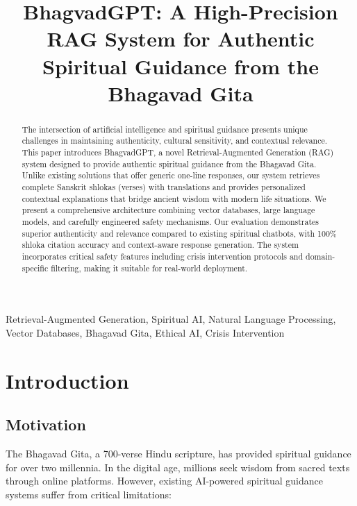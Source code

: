 \documentclass[conference]{IEEEtran}
\begin{document}
\title{BhagvadGPT: A High-Precision RAG System for Authentic Spiritual Guidance from the Bhagavad Gita}

\author{
}

\maketitle

\begin{abstract}
The intersection of artificial intelligence and spiritual guidance presents unique challenges in maintaining authenticity, cultural sensitivity, and contextual relevance. This paper introduces BhagvadGPT, a novel Retrieval-Augmented Generation (RAG) system designed to provide authentic spiritual guidance from the Bhagavad Gita. Unlike existing solutions that offer generic one-line responses, our system retrieves complete Sanskrit shlokas (verses) with translations and provides personalized contextual explanations that bridge ancient wisdom with modern life situations. We present a comprehensive architecture combining vector databases, large language models, and carefully engineered safety mechanisms. Our evaluation demonstrates superior authenticity and relevance compared to existing spiritual chatbots, with 100\% shloka citation accuracy and context-aware response generation. The system incorporates critical safety features including crisis intervention protocols and domain-specific filtering, making it suitable for real-world deployment.
\end{abstract}

\begin{IEEEkeywords}
Retrieval-Augmented Generation, Spiritual AI, Natural Language Processing, Vector Databases, Bhagavad Gita, Ethical AI, Crisis Intervention
\end{IEEEkeywords}

\section{Introduction}

\subsection{Motivation}
The Bhagavad Gita, a 700-verse Hindu scripture, has provided spiritual guidance for over two millennia. In the digital age, millions seek wisdom from sacred texts through online platforms. However, existing AI-powered spiritual guidance systems suffer from critical limitations:
\end{document}
